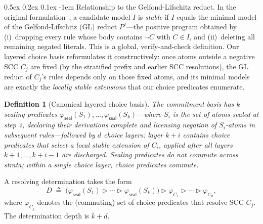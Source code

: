 \documentclass[acmsmall,review,anonymous]{acmart}
\makeatletter
\renewcommand{\paragraph}{\@startsection{paragraph}{4}{\z@}%
  {0.5ex \@plus 0.2ex \@minus 0.1ex}%
  {-1em}%
  {\normalfont\normalsize\bfseries}}
\newcommand{\seal}{\mathsf{seal}}
\newcommand{\seq}{\mathbin{\triangleright}}
\newtheorem{definition}{Definition}
\theoremstyle{remark}
\numberwithin{definition}{section}
\numberwithin{theorem}{section}
\numberwithin{lemma}{section}
\numberwithin{corollary}{section}
\numberwithin{remark}{section}
\numberwithin{example}{section}
\numberwithin{observation}{section}
\numberwithin{assumption}{section}
\makeatother
\begin{document}
\paragraph{Relationship to the Gelfond-Lifschitz reduct.}
In the original formulation~\cite{gelfond1988stable}, a candidate model
$I$ is \emph{stable} if $I$ equals the minimal model of the
Gelfond-Lifschitz (GL) reduct $P^I$---the positive program obtained by
(i)~dropping every rule whose body contains $\neg C$ with $C \in I$,
and (ii)~deleting all remaining negated literals.
This is a global, verify-and-check definition.
Our layered choice basis reformulates it constructively: once atoms
outside a negative SCC $C_j$ are fixed (by the stratified prefix and
earlier SCC resolutions), the GL reduct of $C_j$'s rules depends only
on those fixed atoms, and its minimal models are exactly the
\emph{locally stable extensions} that our choice predicates enumerate.

\begin{definition}[Canonical layered choice basis]
  \label{def:canonical-choice-basis}
  The commitment basis has $k$ sealing predicates
  $\varphi_{\seal}(S_1), \ldots, \varphi_{\seal}(S_k)$---where $S_i$
  is the set of atoms sealed at step~$i$, declaring their derivations
  complete and licensing negation of $S_i$-atoms in subsequent
  rules---followed by $d$ choice layers: layer $k{+}i$ contains choice
  predicates that select a local stable extension of $C_i$, applied
  after all layers $k{+}1, \ldots, k{+}i{-}1$ are discharged.
  Sealing predicates do not commute across strata; within a single
  choice layer, choice predicates commute.
\end{definition}

\noindent
A resolving determination takes the form
\[
  D \;\triangleq\;
  \bigl(
  \varphi_{\seal}(S_1)
  \seq \cdots \seq
  \varphi_{\seal}(S_k)
  \bigr)
  \seq
  \varphi_{C_1} \seq \cdots \seq \varphi_{C_d},
\]
where $\varphi_{C_j}$ denotes the (commuting) set of choice predicates
that resolve SCC $C_j$.
The determination depth is $k{+}d$.
\end{document}
